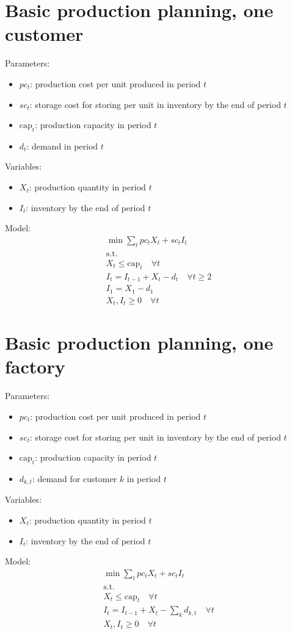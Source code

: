 \documentclass[10pt]{article}
\begin{document}
\section{Basic production planning, one customer}
Parameters: 
\begin{itemize}
    \item $pc_t $: production cost per unit produced in period $t $
    \item $sc_t $: storage cost for storing per unit in inventory by the end of period $t $
    \item $\text{cap}_t $: production capacity in period $t $
    \item $d_t$: demand in period $t $
\end{itemize}
Variables: 
\begin{itemize}
    \item $X_t $: production quantity in period $t $
    \item $I_t $: inventory by the end of period $t $
\end{itemize}
Model:
\begin{gather*}
    \min\sum_t pc_t X_t + sc_t I_t\\
    \text{s.t.}\\
    X_t \le \text{cap}_t\quad\forall t\\
    I_t = I_{t - 1} + X_t - d_t\quad\forall t \ge 2\\
    I_1 = X_1 - d_1\\
    X_t, I_t \ge 0 \quad \forall t
\end{gather*}
\section{Basic production planning, one factory}
Parameters: 
\begin{itemize}
    \item $pc_t $: production cost per unit produced in period $t $
    \item $sc_t $: storage cost for storing per unit in inventory by the end of period $t $
    \item $\text{cap}_t $: production capacity in period $t $
    \item $d_{k, t}$: demand for customer $k $ in period $t $
\end{itemize}
Variables: 
\begin{itemize}
    \item $X_t $: production quantity in period $t $
    \item $I_t $: inventory by the end of period $t $
\end{itemize}
Model:
\begin{gather*}
    \min\sum_t pc_t X_t + sc_t I_t\\
    \text{s.t.}\\
    X_t \le \text{cap}_t\quad\forall t\\
    I_t = I_{t - 1} + X_t - \sum_k d_{k, t}\quad\forall t\\
    X_t, I_t \ge 0 \quad \forall t
\end{gather*}
\newpage 
\end{document}
